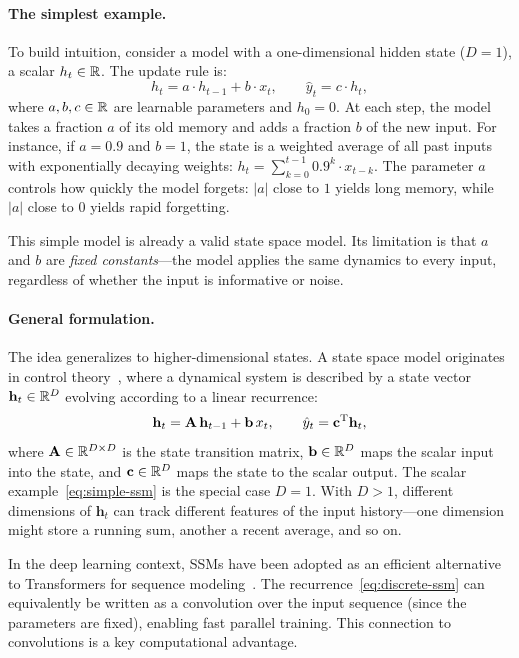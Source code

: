 \documentclass[11pt]{article}
\newcommand\hh{\mathbf{h}}
\begin{document}
\paragraph{The simplest example.}
To build intuition, consider a model with a one-dimensional hidden state ($D=1$), a scalar $h_t \in \mathbb{R}$.
The update rule is:
\begin{equation}
    \label{eq:simple-ssm}
    h_t = a \cdot h_{t-1} + b \cdot x_t, \qquad \hat{y}_t = c \cdot h_t,
\end{equation}
where $a, b, c \in \mathbb{R}$ are learnable parameters and $h_0 = 0$.
At each step, the model takes a fraction $a$ of its old memory and adds a fraction $b$ of the new input.
For instance, if $a = 0.9$ and $b = 1$, the state is a weighted average of all past inputs with exponentially decaying weights: $h_t = \sum_{k=0}^{t-1} 0.9^k \cdot x_{t-k}$.
The parameter $a$ controls how quickly the model forgets: $|a|$ close to $1$ yields long memory, while $|a|$ close to $0$ yields rapid forgetting.

This simple model is already a valid state space model.
Its limitation is that $a$ and $b$ are \emph{fixed constants}---the model applies the same dynamics to every input, regardless of whether the input is informative or noise.

\paragraph{General formulation.}
The idea generalizes to higher-dimensional states.
A state space model originates in control theory~\citep{kalman1960new}, where a dynamical system is described by a state vector $\hh_t \in \R^D$ evolving according to a linear recurrence:
\begin{equation}
    \label{eq:discrete-ssm}
    \hh_t = \AA\, \hh_{t-1} + \bb\, x_t, \qquad \hat{y}_t = \cc^\transpose \hh_t,
\end{equation}
where $\mathbf{A} \in \mathbb{R}^{D \times D}$ is the state transition matrix, $\mathbf{b} \in \mathbb{R}^D$ maps the scalar input into the state, and $\mathbf{c} \in \mathbb{R}^D$ maps the state to the scalar output.
The scalar example~\eqref{eq:simple-ssm} is the special case $D=1$.
With $D > 1$, different dimensions of $\hh_t$ can track different features of the input history---one dimension might store a running sum, another a recent average, and so on.

In the deep learning context, SSMs have been adopted as an efficient alternative to Transformers for sequence modeling~\citep{gu2022efficiently}.
The recurrence~\eqref{eq:discrete-ssm} can equivalently be written as a convolution over the input sequence (since the parameters are fixed), enabling fast parallel training.
This connection to convolutions is a key computational advantage.
\end{document}
